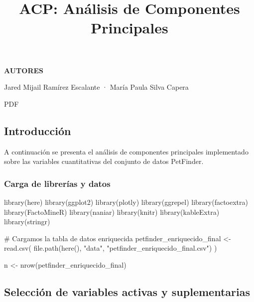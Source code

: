 \documentclass[
  spanish,
  letterpaper,
  DIV=11,
  numbers=noendperiod]{scrartcl}
\title{ACP: Análisis de Componentes Principales}
\author{}
\date{}
\newenvironment{Shaded}{\begin{snugshade}}{\end{snugshade}}
\newcommand{\CommentTok}[1]{\textcolor[rgb]{0.37,0.37,0.37}{#1}}
\newcommand{\FunctionTok}[1]{\textcolor[rgb]{0.28,0.35,0.67}{#1}}
\newcommand{\NormalTok}[1]{\textcolor[rgb]{0.00,0.23,0.31}{#1}}
\newcommand{\OtherTok}[1]{\textcolor[rgb]{0.00,0.23,0.31}{#1}}
\newcommand{\StringTok}[1]{\textcolor[rgb]{0.13,0.47,0.30}{#1}}
\begin{document}
\maketitle


\textbf{AUTORES}

Jared Mijail Ramírez Escalante · María Paula Silva Capera

PDF

\subsection{Introducción}\label{introducciuxf3n}

A continuación se presenta el análisis de componentes principales
implementado sobre las variables cuantitativas del conjunto de datos
PetFinder.

\subsubsection{Carga de librerías y
datos}\label{carga-de-libreruxedas-y-datos}

\begin{Shaded}
\begin{Highlighting}[]
\FunctionTok{library}\NormalTok{(here)}
\FunctionTok{library}\NormalTok{(ggplot2)}
\FunctionTok{library}\NormalTok{(plotly)}
\FunctionTok{library}\NormalTok{(ggrepel)}
\FunctionTok{library}\NormalTok{(factoextra)}
\FunctionTok{library}\NormalTok{(FactoMineR)}
\FunctionTok{library}\NormalTok{(naniar)}
\FunctionTok{library}\NormalTok{(knitr)}
\FunctionTok{library}\NormalTok{(kableExtra)}
\FunctionTok{library}\NormalTok{(stringr)}

\CommentTok{\# Cargamos la tabla de datos enriquecida}
\NormalTok{petfinder\_enriquecido\_final }\OtherTok{\textless{}{-}} \FunctionTok{read.csv}\NormalTok{(}
  \FunctionTok{file.path}\NormalTok{(}\FunctionTok{here}\NormalTok{(), }\StringTok{"data"}\NormalTok{, }\StringTok{"petfinder\_enriquecido\_final.csv"}\NormalTok{)}
\NormalTok{)}

\NormalTok{n }\OtherTok{\textless{}{-}} \FunctionTok{nrow}\NormalTok{(petfinder\_enriquecido\_final)}
\end{Highlighting}
\end{Shaded}

\subsection{Selección de variables activas y
suplementarias}\label{selecciuxf3n-de-variables-activas-y-suplementarias}
\end{document}
